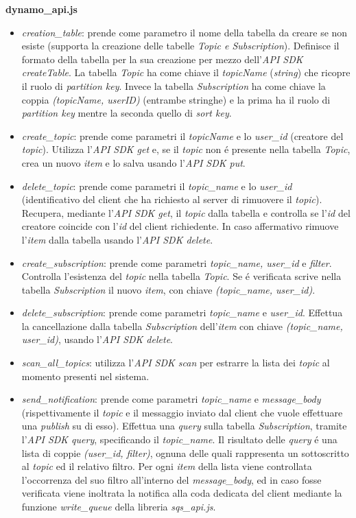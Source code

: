\documentclass{article}
\begin{document}
\textbf{dynamo\_api.js}
\begin{itemize}
\item{\textit{creation\_table}: prende come parametro il nome della tabella da creare se non esiste (supporta la creazione delle tabelle \textit{Topic e Subscription}). Definisce il formato della tabella per la sua creazione per mezzo dell'\textit{API SDK createTable}. La tabella \textit{Topic} ha come chiave il \textit{topicName} (\textit{string}) che ricopre il ruolo di \textit{partition key}. Invece la tabella \textit{Subscription} ha come chiave la coppia \textit{(topicName, userID)} (entrambe stringhe) e la prima ha il ruolo di \textit{partition key} mentre la seconda quello di \textit{sort key}.}
\item{\textit{create\_topic}: prende come parametri il \textit{topicName} e lo \textit{user\_id} (creatore del \textit{topic}). Utilizza l'\textit{API SDK get} e, se il \textit{topic} non \'e presente nella tabella \textit{Topic}, crea un nuovo \textit{item} e lo salva usando l'\textit{API SDK put}.}
\item{\textit{delete\_topic}: prende come parametri il \textit{topic\_name} e lo \textit{user\_id} (identificativo del client che ha richiesto al server di rimuovere il \textit{topic}). Recupera, mediante l'\textit{API SDK get}, il \textit{topic} dalla tabella e controlla se l'\textit{id} del creatore coincide con l'\textit{id} del client richiedente. In caso affermativo rimuove l'\textit{item} dalla tabella usando l'\textit{API SDK delete}.}
\item{\textit{create\_subscription}: prende come parametri \textit{topic\_name, user\_id} e \textit{filter}. Controlla l'esistenza del \textit{topic} nella tabella \textit{Topic}. Se \'e verificata scrive nella tabella \textit{Subscription} il nuovo \textit{item}, con chiave \textit{(topic\_name, user\_id)}.}
\item{\textit{delete\_subscription}: prende come parametri \textit{topic\_name} e \textit{user\_id}. Effettua la cancellazione dalla tabella \textit{Subscription} dell'\textit{item} con chiave \textit{(topic\_name, user\_id)}, usando l'\textit{API SDK delete}.}
\item{\textit{scan\_all\_topics}: utilizza l'\textit{API SDK scan} per estrarre la lista dei \textit{topic} al momento presenti nel sistema.}
\item{\textit{send\_notification}: prende come parametri \textit{topic\_name} e \textit{message\_body} (rispettivamente il \textit{topic} e il messaggio inviato dal client che vuole effettuare una \textit{publish} su di esso). Effettua una \textit{query} sulla tabella \textit{Subscription}, tramite l'\textit{API SDK query}, specificando il \textit{topic\_name}. Il risultato delle \textit{query} \'e una lista di coppie \textit{(user\_id, filter)}, ognuna delle quali rappresenta un sottoscritto al \textit{topic} ed il relativo filtro. Per ogni \textit{item} della lista viene controllata l'occorrenza del suo filtro all'interno del \textit{message\_body}, ed in caso fosse verificata viene inoltrata la notifica alla coda dedicata del client mediante la funzione \textit{write\_queue} della libreria \textit{sqs\_api.js}.}
\end{itemize}
\end{document}
